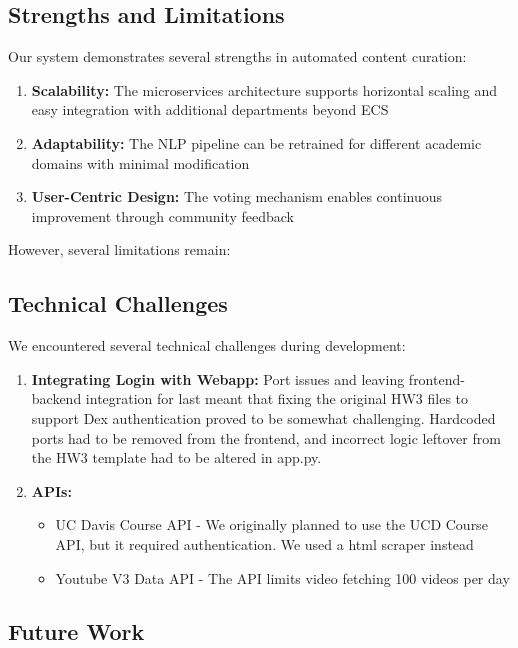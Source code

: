\documentclass[manuscript,nonacm]{acmart}
\begin{document}
\subsection{Strengths and Limitations}

Our system demonstrates several strengths in automated content curation:

\begin{enumerate}
    \item \textbf{Scalability:} The microservices architecture supports horizontal scaling and easy integration with additional departments beyond ECS
    \item \textbf{Adaptability:} The NLP pipeline can be retrained for different academic domains with minimal modification
    \item \textbf{User-Centric Design:} The voting mechanism enables continuous improvement through community feedback
\end{enumerate}

However, several limitations remain:

\subsection{Technical Challenges}

We encountered several technical challenges during development:
\begin{enumerate}
    \item \textbf{Integrating Login with Webapp:} Port issues and leaving frontend-backend integration for last meant that fixing the original HW3 files to support Dex authentication proved to be somewhat challenging. Hardcoded ports had to be removed from the frontend, and incorrect logic leftover from the HW3 template had to be altered in app.py.
    \item \textbf{APIs:}
    \begin{itemize}
        \item UC Davis Course API - We originally planned to use the UCD Course API, but it required authentication. We used a html scraper instead
        \item Youtube V3 Data API - The API limits video fetching 100 videos per day
    \end{itemize}
\end{enumerate}

\subsection{Future Work}
\end{document}
